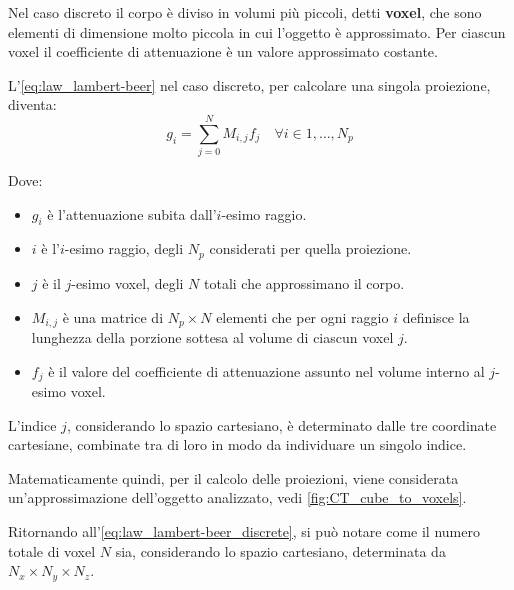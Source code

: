 \documentclass[12pt,a4paper]{report}
\begin{document}
Nel caso discreto il corpo è diviso in volumi più piccoli, detti \textbf{voxel}, che sono elementi di dimensione molto piccola in
cui l'oggetto è approssimato.
Per ciascun voxel il coefficiente di attenuazione è un valore approssimato costante.

L'\autoref{eq:law_lambert-beer} nel caso discreto, per calcolare una singola proiezione, diventa:
\begin{equation} \label{eq:law_lambert-beer_discrete}
  g_i = \sum_{j=0}^N M_{i, j} f_j \quad \forall i \in 1, \dots, N_p
\end{equation}

Dove:
\begin{itemize}
  \item \(g_i\) è l'attenuazione subita dall'\(i\)-esimo raggio.
  \item \(i\) è l'\(i\)-esimo raggio, degli \(N_p\) considerati per quella proiezione.
  \item \(j\) è il \(j\)-esimo voxel, degli \(N\) totali che approssimano il corpo.
  \item \(M_{i,j}\) è una matrice di \(N_p \times N\) elementi che per ogni raggio \(i\) definisce la lunghezza della porzione
        sottesa al volume di ciascun voxel \(j\).
  \item \(f_j\) è il valore del coefficiente di attenuazione assunto nel volume interno al \(j\)-esimo voxel.
\end{itemize}

L'indice \(j\), considerando lo spazio cartesiano, è determinato dalle tre coordinate cartesiane, combinate tra di loro in modo da
individuare un singolo indice.

Matematicamente quindi, per il calcolo delle proiezioni, viene considerata un'approssimazione dell'oggetto analizzato, vedi
\autoref{fig:CT_cube_to_voxels}.

Ritornando all'\autoref{eq:law_lambert-beer_discrete}, si può notare come il numero totale di voxel \(N\) sia, considerando lo
spazio cartesiano, determinata da \(N_x \times N_y \times N_z\).
\end{document}
